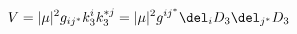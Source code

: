 \begin{equation}
  V = |\mu|^2 g_{ij^*} k_3^i k_3^{*j}  
    = |\mu|^2 g^{ij^*} \del_i D_3 \del_{j^*} D_3 %
\end{equation}

